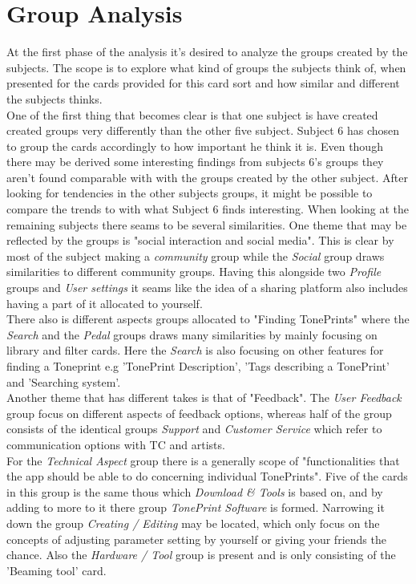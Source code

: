 \section{Group Analysis}
\label{GroupAnalysis}
%
At the first phase of the analysis it's desired to analyze the groups created by the subjects. The scope is to explore what kind of groups the subjects think of, when presented for the cards provided for this card sort and how similar and different the subjects thinks.\\  
One of the first thing that becomes clear is that one subject is have created created groups very differently than the other five subject. Subject 6 has chosen to group the cards accordingly to how important he think it is. Even though there may be derived some interesting findings from subjects 6's groups they aren't found comparable with with the groups created by the other subject. After looking for tendencies in the other subjects groups, it might be possible to compare the trends to with what Subject 6 finds interesting. When looking at the remaining subjects there seams to be several similarities. One theme that may be reflected by the groups is "social interaction and social media". This is clear by most of the subject making a \textit{community} group while the \textit{Social} group draws similarities to different community groups. Having this alongside two \textit{Profile} groups and \textit{User settings} it seams like the idea of a sharing platform also includes having a part of it allocated to yourself. \\
There also is different aspects groups allocated to "Finding TonePrints" where the \textit{Search} and the \textit{Pedal} groups draws many similarities by mainly focusing on library and filter cards. Here the \textit{Search} is also focusing on other features for finding a Toneprint e.g 'TonePrint Description', 'Tags describing a TonePrint' and 'Searching system'.  \\
Another theme that has different takes is that of "Feedback". The \textit{User Feedback} group focus on different aspects of feedback options, whereas half of the group consists of the identical groups \textit{Support} and \textit{Customer Service} which refer to communication options with TC and artists. \\
For the \textit{Technical Aspect} group there is a generally scope of "functionalities that the app should be able to do concerning individual TonePrints". Five of the cards in this group is the same thous which \textit{Download \& Tools} is based on, and by adding to more to it there group \textit{TonePrint Software} is formed. Narrowing it down the group \textit{Creating / Editing} may be located, which only focus on the concepts of adjusting parameter setting by yourself or giving your friends the chance. Also the \textit{Hardware / Tool} group is present and is only consisting of the 'Beaming tool' card.\\

